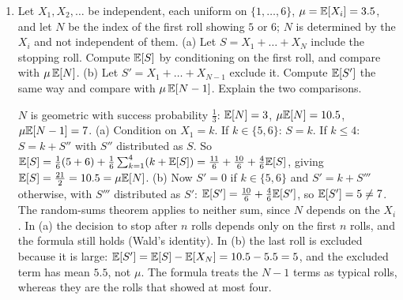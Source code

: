 \begin{enumerate}[series=quiz,label=\arabic*.,leftmargin=2.6em]
\item Let $X_1,X_2,\dots$ be independent, each uniform on $\{1,\dots,6\}$, $\mu=\mathbb{E}[X_i]=3.5$, and let $N$ be the index of the first roll showing $5$ or $6$; $N$ is determined by the $X_i$ and not independent of them. (a) Let $S=X_1+\dots+X_N$ include the stopping roll. Compute $\mathbb{E}[S]$ by conditioning on the first roll, and compare with $\mu\,\mathbb{E}[N]$. (b) Let $S'=X_1+\dots+X_{N-1}$ exclude it. Compute $\mathbb{E}[S']$ the same way and compare with $\mu\,\mathbb{E}[N-1]$. Explain the two comparisons.
\begin{solution}
$N$ is geometric with success probability $\tfrac13$: $\mathbb{E}[N]=3$, $\mu\mathbb{E}[N]=10.5$, $\mu\mathbb{E}[N-1]=7$.
(a) Condition on $X_1=k$. If $k\in\{5,6\}$: $S=k$. If $k\le4$: $S=k+S''$ with $S''$ distributed as $S$. So $\mathbb{E}[S]=\tfrac16(5+6)+\tfrac16\sum_{k=1}^4(k+\mathbb{E}[S])=\tfrac{11}6+\tfrac{10}6+\tfrac46\mathbb{E}[S]$, giving $\mathbb{E}[S]=\tfrac{21}2=10.5=\mu\mathbb{E}[N]$.
(b) Now $S'=0$ if $k\in\{5,6\}$ and $S'=k+S'''$ otherwise, with $S'''$ distributed as $S'$: $\mathbb{E}[S']=\tfrac{10}6+\tfrac46\mathbb{E}[S']$, so $\mathbb{E}[S']=5\ne7$.
The random-sums theorem applies to neither sum, since $N$ depends on the $X_i$. In (a) the decision to stop after $n$ rolls depends only on the first $n$ rolls, and the formula still holds (Wald's identity). In (b) the last roll is excluded because it is large: $\mathbb{E}[S']=\mathbb{E}[S]-\mathbb{E}[X_N]=10.5-5.5=5$, and the excluded term has mean $5.5$, not $\mu$. The formula treats the $N-1$ terms as typical rolls, whereas they are the rolls that showed at most four.
\end{solution}
\end{enumerate}
